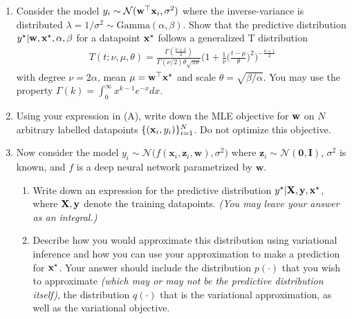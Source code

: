\documentclass[11pt]{article}
\begin{document}
\begin{enumerate}[label=(\Alph*)]

    \item Consider the model $y_i \sim \mathcal{N}({\mathbf w}^\top {\mathbf x}_i, \sigma^2)$ where the inverse-variance is distributed $\lambda = 1/\sigma^2 \sim \text{Gamma}(\alpha, \beta)$. Show that the predictive distribution $y^\star|{\mathbf w}, {\mathbf x}^\star, \alpha, \beta$ for a datapoint ${\mathbf x}^\star$ follows a generalized T distribution
    \begin{align*} 
    T(t ; \nu,\mu,\theta)
    =
    \frac{\Gamma(\frac{\nu+1}{2})}{\Gamma(\nu/2)\theta\sqrt{\pi \nu }} \Big(1 + \frac{1}{\nu}\Big(\frac{t-\mu}{\theta}\Big)^2 \Big)^{-\frac{\nu + 1}{2}}
    \end{align*} 
    with degree $\nu = 2\alpha$, mean $\mu = {\mathbf w}^\top {\mathbf x}^\star$ and scale $\theta = \sqrt{\beta / \alpha}$.
    You may use the property
    $\Gamma(k) = \int_0^\infty x^{k-1} e^{-x} dx $.\\


    \item Using your expression in (A), write down the MLE objective for ${\mathbf w}$ on $N$ arbitrary labelled datapoints $\{ ( {\mathbf x}_i, y_i ) \}^N_{i=1}$. Do not optimize this objective.

    
    \item Now consider the model $y_i \sim \mathcal{N}\Big( f(\mathbf{x}_i, \mathbf{z}_i, \mathbf{w}) , \sigma^2 \Big)$ where $\mathbf{z}_i \sim \mathcal{N}(\mathbf{0}, \mathbf{I})$, $\sigma^2$ is known, and $f$ is a deep neural network parametrized by $\mathbf{w}$.
    
    \begin{enumerate}[label=(\roman*)]
    
        \item Write down an expression for the predictive distribution $y^\star|{\mathbf X}, {\mathbf y}, {\mathbf x}^\star$, where ${\mathbf X}, {\mathbf y}$ denote the training datapoints. \textit{(You may leave your answer as an integral.)}
    
        \item Describe how you would approximate this distribution using variational inference and how you can use your approximation to make a prediction for ${\mathbf x}^\star$. Your answer should include the distribution $p(\cdot)$ that you wish to approximate \textit{(which may or may not be the predictive distribution itself)}, the distribution $q(\cdot)$ that is the variational approximation, as well as the variational objective. 
    \end{enumerate}
    

\end{enumerate}
\end{document}
